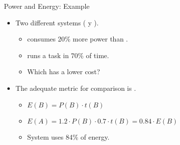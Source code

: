 \begin{frame}[t]{Power and Energy: Example}
\begin{itemize}
  \item Two different systems ( y ).
    \begin{itemize}
      \item {} consumes 20\% more power than .
      \item {} runs a task in 70\% of  time.
      \item Which has a lower cost?
    \end{itemize}

  \item The adequate metric for comparison is .
    \begin{itemize}
      \item $E(B) = P(B) \cdot t(B)$
      \item $E(A) = 1.2 \cdot P(B) \cdot 0.7 \cdot t(B) = 0.84 \cdot E(B)$
      \item System  uses 84\% of  energy.
    \end{itemize}
\end{itemize}
\end{frame}

